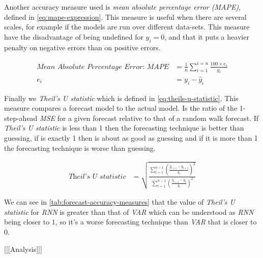 Another accuracy measure used is \textit{mean absolute percentage
  error (MAPE)}, defined in \autoref{eq:mape-expression}. This measure
is useful when there are several scales, for example if the models are
run over different data-sets. This measure have the disadvantage of
being undefined for $y_i = 0$, and that it puts a heavier penalty on
negative errors than on positive errors.

\begin{equation}
  \begin{aligned}
    \label{eq:mape-expression}
    \textit{Mean Absolute Percentage Error: MAPE} & = \frac{1}{n}
    \sum_{i=1}^{i=n} \frac{100 \times e_i}{y_i} \\
    e_i & = y_i - \hat{y}_i
  \end{aligned}
\end{equation}

Finally we \textit{Theil's U statistic} which is defined in
\autoref{eq:theils-u-statistic}. This measure compares a forecast
model to the actual model. Is the ratio of the 1-step-ahead
\textit{MSE} for a given forecast relative to that of a random walk
forecast. If \textit{Theil's U statistic} is less than 1 then the
forecasting technique is better than guessing, if is exactly 1 then is
about as good as guessing and if it is more than 1 the forecasting
technique is worse than guessing.

\begin{equation}
  \begin{aligned}
    \label{eq:theils-u-statistic}
    \textit{Theil's U statistic} & = \sqrt{\frac {\displaystyle\sum_{t
          = 1}^{n - 1} \left( \frac{\hat{y}_{t+1} - y_{t+1}}{y_t}
        \right)^2} {\displaystyle\sum_{t = 1}^{n - 1} \left(
          \frac{y_{t+1} - y_t}{y_t} \right)^2}}
  \end{aligned}
\end{equation}

We can see in \autoref{tab:forecast-accuracy-measures} that the value
of \textit{Theil's U statistic} for \textit{RNN} is greater than that
of \textit{VAR} which can be understood as \textit{RNN} being closer
to $1$, so it's a worse forecasting technique than \textit{VAR} that
is closer to $0$.


[[[Analysis]]]

